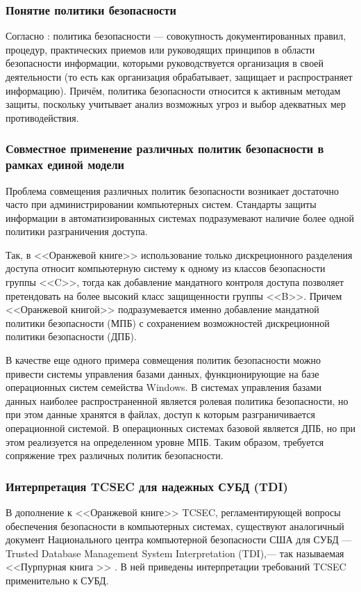 \subsubsection{Понятие политики безопасности}
Согласно \cite{GOST50922}: политика безопасности --- совокупность документированных
правил, процедур, практических приемов или руководящих принципов в области безопасности
информации, которыми руководствуется организация в своей деятельности (то есть как организация
обрабатывает, защищает и распространяет информацию). Причём, политика безопасности относится
к активным методам защиты, поскольку учитывает анализ возможных угроз и выбор адекватных мер
противодействия.

\subsubsection{Совместное применение различных политик безопасности в рамках единой модели}
Проблема совмещения различных политик безопасности возникает достаточно часто при администрировании компьютерных систем. Стандарты защиты информации в автоматизированных системах подразумевают наличие более одной политики разграничения доступа.

Так, в <<Оранжевой книге>> использование только дискреционного разделения доступа относит компьютерную систему к одному из классов безопасности группы <<C>>, тогда как добавление мандатного контроля доступа позволяет претендовать на более высокий класс защищенности группы <<B>>. Причем <<Оранжевой книгой>> подразумевается именно добавление мандатной политики безопасности (МПБ) с сохранением возможностей дискреционной политики безопасности (ДПБ).

В качестве еще одного примера совмещения политик безопасности можно привести системы управления базами данных, функционирующие на базе операционных систем семейства Windows. В системах управления базами данных наиболее распространенной является ролевая политика безопасности, но при этом данные хранятся в файлах, доступ к которым разграничивается операционной системой. В операционных системах базовой является ДПБ, но при этом реализуется на определенном уровне МПБ. Таким образом, требуется сопряжение трех различных политик безопасности. \cite{CombinedSecurityPolicies}

\subsubsection{Интерпретация TCSEC для надежных СУБД (TDI)}
В дополнение к <<Оранжевой книге>> TCSEC, регламентирующей вопросы обеспечения безопасности в компьютерных системах, существуют аналогичный документ Национального центра компьютерной безопасности США для СУБД --- Trusted Database Management System Interpretation (TDI),--- так называемая <<Пурпурная книга >> \cite{PurpleBook}.
В ней приведены интерпретации требований TCSEC применительно к СУБД.

